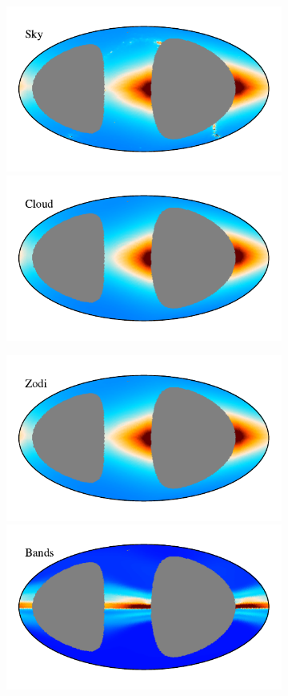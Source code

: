 \documentclass{aa}
\begin{document}
\begin{figure}
\begin{figure}
\centering
\includegraphics[width=0.9\columnwidth]{figs/zodi_comps/zodi_sky_98_week.pdf}\includegraphics[width=0.9\columnwidth]{figs/zodi_comps/zodi_cloud_98_week.pdf}
\vspace{-0.6cm}

\includegraphics[width=0.9\columnwidth]{figs/zodi_comps/zodi_zodi_98_week.pdf}\includegraphics[width=0.9\columnwidth]{figs/zodi_comps/zodi_bands_98_week.pdf}
\vspace{-0.6cm}


\end{figure}
\end{figure}
\end{document}
